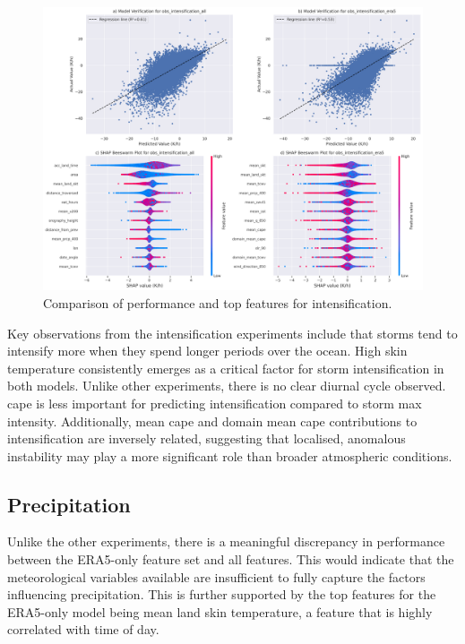 \begin{figure}[ht]
    \centering
    \includegraphics[width=\textwidth]{../figures/generated/experiments/obs_intensification/obs_intensification_summary.png}
    \caption{Comparison of performance and top features for intensification.}
    \label{fig:obs_intensification_summary}
\end{figure}

Key observations from the intensification experiments include that storms tend to intensify more when they spend longer periods over the ocean. High skin temperature consistently emerges as a critical factor for storm intensification in both models. Unlike other experiments, there is no clear diurnal cycle observed. \acrshort{cape} is less important for predicting intensification compared to storm max intensity. Additionally, mean \acrshort{cape} and domain mean \acrshort{cape} contributions to intensification are inversely related, suggesting that localised, anomalous instability may play a more significant role than broader atmospheric conditions.


\clearpage
\subsection{Precipitation}

Unlike the other experiments, there is a meaningful discrepancy in performance between the ERA5-only feature set and all features. This would indicate that the meteorological variables available are insufficient to fully capture the factors influencing precipitation. This is further supported by the top features for the ERA5-only model being mean land skin temperature, a feature that is highly correlated with time of day.

